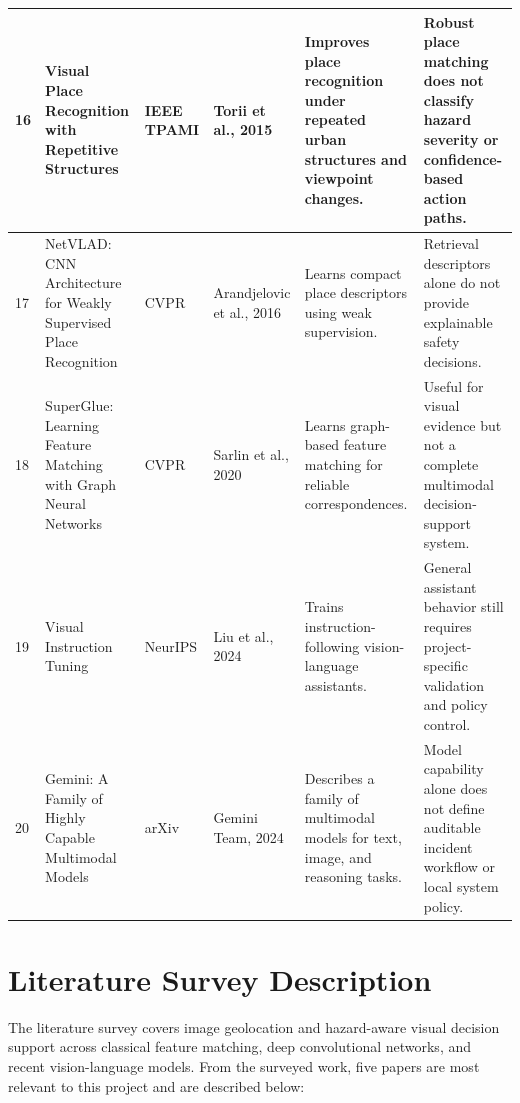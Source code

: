 \begin{longtable}{|p{}|p{}|p{}|p{}|p{}|p{}|}
\hline
16 & Visual Place Recognition with Repetitive Structures & IEEE TPAMI & Torii et al., 2015 & Improves place recognition under repeated urban structures and viewpoint changes. & Robust place matching does not classify hazard severity or confidence-based action paths. \\
\hline
17 & NetVLAD: CNN Architecture for Weakly Supervised Place Recognition & CVPR & Arandjelovic et al., 2016 & Learns compact place descriptors using weak supervision. & Retrieval descriptors alone do not provide explainable safety decisions. \\
\hline
18 & SuperGlue: Learning Feature Matching with Graph Neural Networks & CVPR & Sarlin et al., 2020 & Learns graph-based feature matching for reliable correspondences. & Useful for visual evidence but not a complete multimodal decision-support system. \\
\hline
19 & Visual Instruction Tuning & NeurIPS & Liu et al., 2024 & Trains instruction-following vision-language assistants. & General assistant behavior still requires project-specific validation and policy control. \\
\hline
20 & Gemini: A Family of Highly Capable Multimodal Models & arXiv & Gemini Team, 2024 & Describes a family of multimodal models for text, image, and reasoning tasks. & Model capability alone does not define auditable incident workflow or local system policy. \\
\hline
\end{longtable}
\endgroup

\section{Literature Survey Description}
The literature survey covers image geolocation and hazard-aware visual decision support across classical feature matching, deep convolutional networks, and recent vision-language models. From the surveyed work, five papers are most relevant to this project and are described below:

